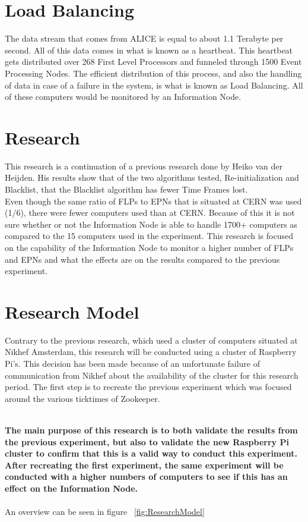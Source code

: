 \section{Load Balancing}
The data stream that comes from ALICE is equal to about 1.1 Terabyte per second. All of this data comes in what is known as a heartbeat. This heartbeat gets distributed over 268 First Level Processors and funneled through	1500 Event Processing Nodes. The efficient distribution of this process, and also the handling of data in case of a failure in the system, is what is known as Load Balancing. All of these computers would be monitored by an Information Node.

\section{Research}
This research is a continuation of a previous research done by Heiko van der Heijden. His results show that of the two algorithms tested, Re-initialization and Blacklist, that the Blacklist algorithm has fewer Time Frames lost.\\
Even though the same ratio of FLPs to EPNs that is situated at CERN was used (1/6), there were fewer computers used than at CERN. Because of this it is not sure whether or not the Information Node is able to handle 1700+ computers as compared to the 15 computers used in the experiment. This research is focused on the capability of the Information Node to monitor a higher number of FLPs and EPNs and what the effects are on the results compared to the previous experiment.

\section{Research Model}
Contrary to the previous research, which used a cluster of computers situated at Nikhef Amsterdam, this research will be conducted using a cluster of Raspberry Pi's. This decision has been made because of an unfortunate failure of communication from Nikhef about the availability of the cluster for this research period. The first step is to recreate the previous experiment which was focused around the various ticktimes of Zookeeper.
\newpage

~\\\textbf{The main purpose of this research is to both validate the results from the previous experiment, but also to validate the new Raspberry Pi cluster to confirm that this is a valid way to conduct this experiment. After recreating the first experiment, the same experiment will be conducted with a higher numbers of computers to see if this has an effect on the Information Node.} \\~\\
An overview can be seen in figure ~\ref{fig:ResearchModel}

